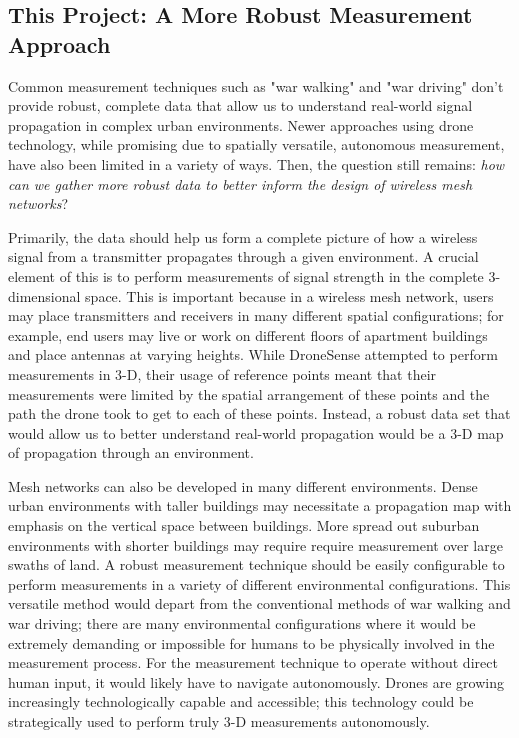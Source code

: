 \documentclass[pageno]{jpaper}
\begin{document}
\subsection{This Project: A More Robust Measurement Approach}
Common measurement techniques such as "war walking" and "war driving" don't provide robust, complete data that allow us to understand real-world signal propagation in complex urban environments. Newer approaches using drone technology, while promising due to spatially versatile, autonomous measurement, have also been limited in a variety of ways. Then, the question still remains: \textit{how can we gather more robust data to better inform the design of wireless mesh networks}?

Primarily, the data should help us form a complete picture of how a wireless signal from a transmitter propagates through a given environment. A crucial element of this is to perform measurements of signal strength in the complete 3-dimensional space. This is important because in a wireless mesh network, users may place transmitters and receivers in many different spatial configurations; for example, end users may live or work on different floors of apartment buildings and place antennas at varying heights. While DroneSense attempted to perform measurements in 3-D, their usage of reference points meant that their measurements were limited by the spatial arrangement of these points and the path the drone took to get to each of these points. Instead, a robust data set that would allow us to better understand real-world propagation would be a 3-D map of propagation through an environment.

Mesh networks can also be developed in many different environments. Dense urban environments with taller buildings may necessitate a propagation map with emphasis on the vertical space between buildings. More spread out suburban environments with shorter buildings may require require measurement over large swaths of land. A robust measurement technique should be easily configurable to perform measurements in a variety of different environmental configurations. This versatile method would  depart from the conventional methods of war walking and war driving; there are many environmental configurations where it would be extremely demanding or impossible for humans to be physically involved in the measurement process. For the measurement technique to operate without direct human input, it would likely have to navigate autonomously. Drones are growing increasingly technologically capable and accessible; this technology could be strategically used to perform truly 3-D measurements autonomously. 
\end{document}
